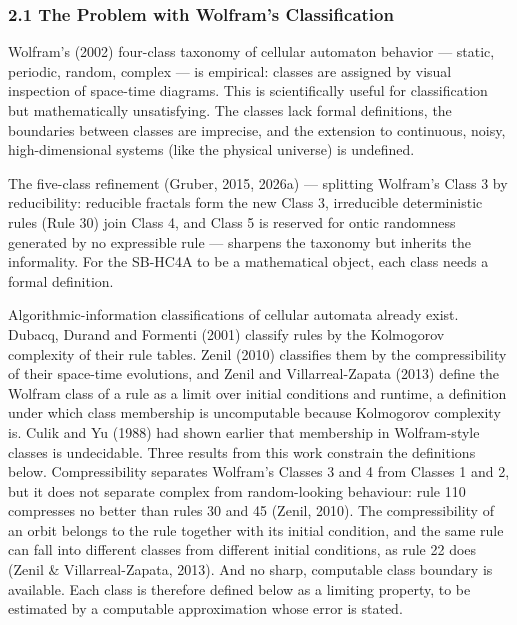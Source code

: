 \documentclass[
]{article}
\begin{document}
\hypertarget{the-problem-with-wolframs-classification}{%
\subsubsection{2.1 The Problem with Wolfram's
Classification}\label{the-problem-with-wolframs-classification}}

Wolfram's (2002) four-class taxonomy of cellular automaton behavior ---
static, periodic, random, complex --- is empirical: classes are assigned
by visual inspection of space-time diagrams. This is scientifically
useful for classification but mathematically unsatisfying. The classes
lack formal definitions, the boundaries between classes are imprecise,
and the extension to continuous, noisy, high-dimensional systems (like
the physical universe) is undefined.

The five-class refinement (Gruber, 2015, 2026a) --- splitting Wolfram's
Class 3 by reducibility: reducible fractals form the new Class 3,
irreducible deterministic rules (Rule 30) join Class 4, and Class 5 is
reserved for ontic randomness generated by no expressible rule ---
sharpens the taxonomy but inherits the informality. For the SB-HC4A to
be a mathematical object, each class needs a formal definition.

Algorithmic-information classifications of cellular automata already
exist. Dubacq, Durand and Formenti (2001) classify rules by the
Kolmogorov complexity of their rule tables. Zenil (2010) classifies them
by the compressibility of their space-time evolutions, and Zenil and
Villarreal-Zapata (2013) define the Wolfram class of a rule as a limit
over initial conditions and runtime, a definition under which class
membership is uncomputable because Kolmogorov complexity is. Culik and
Yu (1988) had shown earlier that membership in Wolfram-style classes is
undecidable. Three results from this work constrain the definitions
below. Compressibility separates Wolfram's Classes 3 and 4 from Classes
1 and 2, but it does not separate complex from random-looking behaviour:
rule 110 compresses no better than rules 30 and 45 (Zenil, 2010). The
compressibility of an orbit belongs to the rule together with its
initial condition, and the same rule can fall into different classes
from different initial conditions, as rule 22 does (Zenil \&
Villarreal-Zapata, 2013). And no sharp, computable class boundary is
available. Each class is therefore defined below as a limiting property,
to be estimated by a computable approximation whose error is stated.
\end{document}

